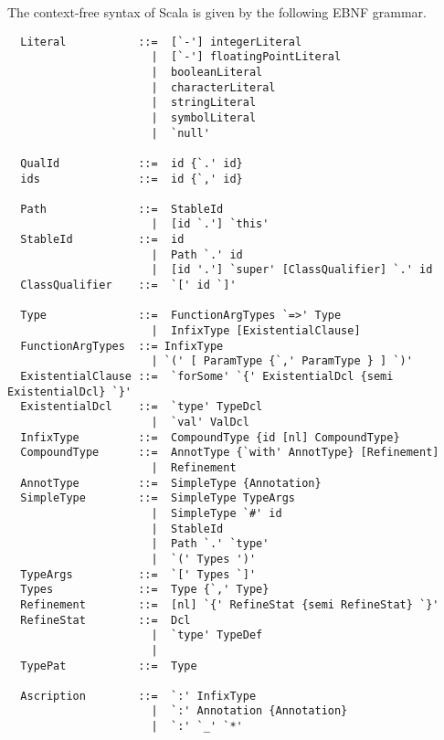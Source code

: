 The context-free syntax of Scala is given by the following EBNF
grammar.

{\small
\begin{lstlisting}
  Literal           ::=  [`-'] integerLiteral
                      |  [`-'] floatingPointLiteral
                      |  booleanLiteral
                      |  characterLiteral
                      |  stringLiteral
                      |  symbolLiteral
                      |  `null'

  QualId            ::=  id {`.' id}
  ids               ::=  id {`,' id}

  Path              ::=  StableId
                      |  [id `.'] `this'
  StableId          ::=  id
                      |  Path `.' id
                      |  [id '.'] `super' [ClassQualifier] `.' id
  ClassQualifier    ::=  `[' id `]'

  Type              ::=  FunctionArgTypes `=>' Type
                      |  InfixType [ExistentialClause]
  FunctionArgTypes  ::= InfixType
                      | `(' [ ParamType {`,' ParamType } ] `)'
  ExistentialClause ::=  `forSome' `{' ExistentialDcl {semi ExistentialDcl} `}'
  ExistentialDcl    ::=  `type' TypeDcl 
                      |  `val' ValDcl
  InfixType         ::=  CompoundType {id [nl] CompoundType}
  CompoundType      ::=  AnnotType {`with' AnnotType} [Refinement]
                      |  Refinement
  AnnotType         ::=  SimpleType {Annotation}
  SimpleType        ::=  SimpleType TypeArgs
                      |  SimpleType `#' id
                      |  StableId
                      |  Path `.' `type'
                      |  `(' Types ')'
  TypeArgs          ::=  `[' Types `]'
  Types             ::=  Type {`,' Type}
  Refinement        ::=  [nl] `{' RefineStat {semi RefineStat} `}'
  RefineStat        ::=  Dcl
                      |  `type' TypeDef
                      |
  TypePat           ::=  Type

  Ascription        ::=  `:' InfixType
                      |  `:' Annotation {Annotation} 
                      |  `:' `_' `*'


\end{lstlisting}}
